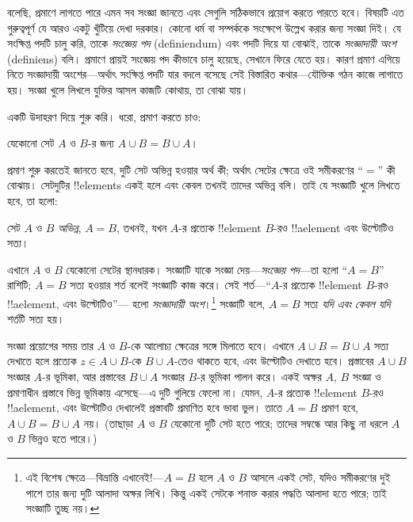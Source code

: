 \documentclass[../../../include/open-logic-section]{subfiles}
\begin{document}


বলেছি, প্রমাণে লাগতে পারে এমন সব সংজ্ঞা জানতে এবং সেগুলি
সঠিকভাবে প্রয়োগ করতে পারতে হবে। বিষয়টি এত গুরুত্বপূর্ণ যে
আরও একটু খুঁটিয়ে দেখা দরকার। কোনো ধর্ম বা সম্পর্ককে সংক্ষেপে
উল্লেখ করার জন্য সংজ্ঞা দিই। যে সংক্ষিপ্ত পদটি চালু করি,
তাকে \emph{সংজ্ঞেয় পদ} (definiendum) এবং পদটি দিয়ে যা বোঝাই,
তাকে \emph{সংজ্ঞাদায়ী অংশ} (definiens) বলি। প্রমাণে প্রায়ই
সংজ্ঞেয় পদ কীভাবে চালু হয়েছে, সেখানে ফিরে যেতে হয়। কারণ
প্রমাণ এগিয়ে নিতে সংজ্ঞাদায়ী অংশের—অর্থাৎ সংক্ষিপ্ত পদটি
যার বদলে বসেছে সেই বিস্তারিত কথার—যৌক্তিক গঠন কাজে
লাগাতে হয়। সংজ্ঞা খুলে লিখলে যুক্তির আসল কাজটি কোথায়,
তা বোঝা যায়।

একটি উদাহরণ দিয়ে শুরু করি। ধরো, প্রমাণ করতে চাও:

\begin{prop}
যেকোনো সেট $A$ ও $B$-র জন্য $A \cup B = B \cup A$।
\end{prop}

প্রমাণ শুরু করতেই জানতে হবে, দুটি সেট অভিন্ন হওয়ার অর্থ
কী; অর্থাৎ সেটের ক্ষেত্রে ওই সমীকরণের ``$=$'' কী বোঝায়।
সেটদুটির !!{element}s একই হলে এবং কেবল তখনই তাদের অভিন্ন
বলি। তাই যে সংজ্ঞাটি খুলে লিখতে হবে, তা হলো:

\begin{defn}
সেট $A$ ও $B$ \emph{অভিন্ন}, $A = B$, তখনই, যখন
$A$-র প্রত্যেক !!{element} $B$-রও !!a{element}
এবং উল্টোটিও সত্য।
\end{defn}

এখানে $A$ ও $B$ যেকোনো সেটের স্থানধারক। সংজ্ঞাটি
যাকে সংজ্ঞা দেয়—\emph{সংজ্ঞেয় পদ}—তা হলো
``$A = B$'' রাশিটি; $A = B$ সত্য হওয়ার শর্ত বলেই
সংজ্ঞাটি কাজ করে। সেই শর্ত—``$A$-র প্রত্যেক
!!{element} $B$-রও !!a{element}, এবং উল্টোটিও''—
হলো \emph{সংজ্ঞাদায়ী অংশ}।\footnote{এই বিশেষ
ক্ষেত্রে—বিভ্রান্তি এখানেই!—$A = B$ হলে $A$ ও $B$
আসলে একই সেট, যদিও সমীকরণের দুই পাশে তার জন্য
দুটি আলাদা অক্ষর লিখি। কিন্তু একই সেটকে শনাক্ত করার
পদ্ধতি আলাদা হতে পারে; তাই সংজ্ঞাটি তুচ্ছ নয়।}
সংজ্ঞাটি বলে, $A = B$ সত্য \emph{যদি এবং কেবল যদি}
শর্তটি সত্য হয়।

সংজ্ঞা প্রয়োগের সময় তার $A$ ও $B$-কে আলোচ্য
ক্ষেত্রের সঙ্গে মিলাতে হবে। এখানে $A \cup B = B \cup A$
সত্য দেখাতে হলে প্রত্যেক $z \in A \cup B$-কে
$B \cup A$-তেও থাকতে হবে, এবং উল্টোটিও দেখাতে
হবে। প্রস্তাবের $A \cup B$ সংজ্ঞার $A$-র ভূমিকা,
আর প্রস্তাবের $B \cup A$ সংজ্ঞার $B$-র ভূমিকা পালন
করে। একই অক্ষর $A$, $B$ সংজ্ঞা ও প্রমাণাধীন
প্রস্তাবে ভিন্ন ভূমিকায় এসেছে—এ দুটি গুলিয়ে ফেলো না।
যেমন, $A$-র প্রত্যেক !!{element} $B$-রও
!!a{element}, এবং উল্টোটিও দেখালেই প্রস্তাবটি
প্রমাণিত হবে ভাবা ভুল। তাতে $A = B$ প্রমাণ হবে,
$A \cup B = B \cup A$ নয়। (তাছাড়া $A$ ও $B$
যেকোনো দুটি সেট হতে পারে; তাদের সম্বন্ধে আর কিছু
না ধরলে $A$ ও $B$ ভিন্নও হতে পারে।)
\end{document}
